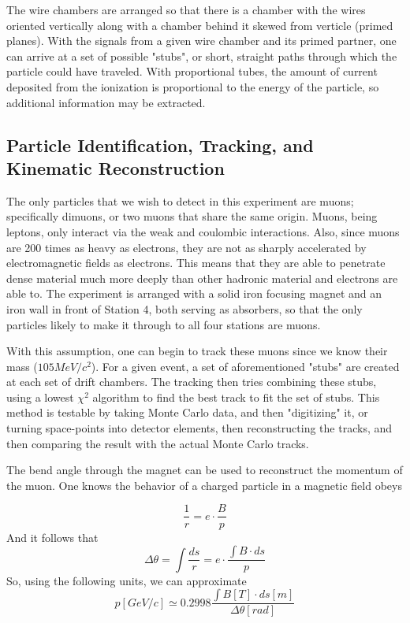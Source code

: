\documentclass[11pt]{article}
\begin{document}
The wire chambers are arranged so that there is a chamber with the wires oriented vertically along with a chamber behind it skewed from verticle (primed planes).  With the signals from a given wire chamber and its primed partner, one can arrive at a set of possible "stubs", or short, straight paths through which the particle could have traveled.  With proportional tubes, the amount of current deposited from the ionization is proportional to the energy of the particle, so additional information may be extracted.

\subsection{Particle Identification, Tracking, and Kinematic Reconstruction}
The only particles that we wish to detect in this experiment are muons; specifically dimuons, or two muons that share the same origin.  Muons, being leptons, only interact via the weak and coulombic interactions.  Also, since muons are 200 times as heavy as electrons, they are not as sharply accelerated by electromagnetic fields as electrons.  This means that they are able to penetrate dense material much more deeply than other hadronic material and electrons are able to.  The experiment is arranged with a solid iron focusing magnet and an iron wall in front of Station 4, both serving as absorbers, so that the only particles likely to make it through to all four stations are muons.

With this assumption, one can begin to track these muons since we know their mass ($105 MeV/c^2$).  For a given event, a set of aforementioned "stubs" are created at each set of drift chambers. The tracking then tries combining these stubs, using a lowest $\chi^2$ algorithm to find the best track to fit the set of stubs. This method is testable by taking Monte Carlo data, and then "digitizing" it, or turning space-points into detector elements, then reconstructing the tracks, and then comparing the result with the actual Monte Carlo tracks.

The bend angle through the magnet can be used to reconstruct the momentum of the muon.  One knows the behavior of a charged particle in a magnetic field obeys

\begin{equation}
	\frac{1}{r} = e \cdot \frac{B}{p}
\end{equation}
And it follows that
\begin{equation}
	\Delta\theta=\int\frac{ds}{r}=e\cdot \frac{\int B \cdot ds}{p}
\end{equation}
So, using the following units, we can approximate
\begin{equation}
	p[GeV/c] \simeq 0.2998 \frac{\int B[T] \cdot ds[m]}{\Delta \theta [rad]}
\end{equation}  	
\end{document}
